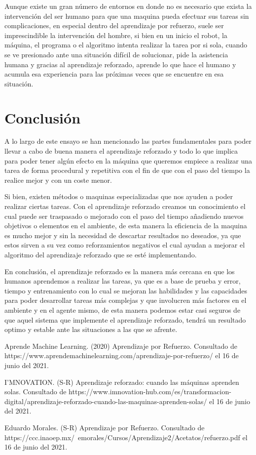 \documentclass{article}
\begin{document}
Aunque existe un gran número de entornos en donde no es necesario que exista la intervención del ser humano para que una maquina pueda efectuar sus tareas sin complicaciones, en especial dentro del aprendizaje por refuerzo, suele ser imprescindible la intervención del hombre, si bien en un inicio el robot, la máquina, el programa o el algoritmo intenta realizar la tarea por si sola, cuando se ve presionado ante una situación difícil de solucionar, pide la asistencia humana y gracias al aprendizaje reforzado, aprende lo que hace el humano y acumula esa experiencia para las próximas veces que se encuentre en esa situación.

\section*{Conclusión}
A lo largo de este ensayo se han mencionado las partes fundamentales para poder llevar a cabo de buena manera el aprendizaje reforzado y todo lo que implica para poder tener algún efecto en la máquina que queremos empiece a realizar una tarea de forma procedural y repetitiva con el fin de que con el paso del tiempo la realice mejor y con un coste menor.

Si bien, existen métodos o maquinas especializadas que nos ayuden a poder realizar ciertas tareas. Con el aprendizaje reforzado creamos un conocimiento el cual puede ser traspasado o mejorado con el paso del tiempo añadiendo nuevos objetivos o elementos en el ambiente, de esta manera la eficiencia de la maquina es mucho mejor y sin la necesidad de descartar resultados no deseados, ya que estos sirven a su vez como reforzamientos negativos el cual ayudan a mejorar el algoritmo del aprendizaje reforzado que se esté implementando.

En conclusión, el aprendizaje reforzado es la manera más cercana en que los humanos aprendemos a realizar las tareas, ya que es a base de prueba y error, tiempo y entrenamiento con lo cual se mejoran las habilidades y las capacidades para poder desarrollar tareas más complejas y que involucren más factores en el ambiente y en el agente mismo, de esta manera podemos estar casi seguros de que aquel sistema que implemente el aprendizaje reforzado, tendrá un resultado optimo y estable ante las situaciones a las que se afrente.

\begin{thebibliography}{0}
   Aprende Machine Learning. (2020) Aprendizaje por Refuerzo. Consultado de https://www.aprendemachinelearning.com/aprendizaje-por-refuerzo/ el 16 de junio del 2021.

   I'MNOVATION. (S-R) Aprendizaje reforzado: cuando las máquinas aprenden solas. Consultado de https://www.imnovation-hub.com/es/transformacion-digital/aprendizaje-reforzado-cuando-las-maquinas-aprenden-solas/ el 16 de junio del 2021.
  
   Eduardo Morales. (S-R) Aprendizaje por Refuerzo. Consultado de https://ccc.inaoep.mx/~emorales/Cursos/Aprendizaje2/Acetatos/refuerzo.pdf el 16 de junio del 2021.
  
\end{thebibliography}
\end{document}
